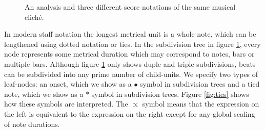 \begin{figure}[t]
\centering
{}

\caption{An analysis and three different score notations of the same musical clich\'e. }
\label{fig:subdivision}
\end{figure}

In modern staff notation the longest metrical unit is a whole note, which can be lengthened using dotted notation or ties. In the subdivision tree in figure \ref{fig:subdivision}, every node represents some metrical duration which may correspond to notes, bars or multiple bars. Although figure \ref{fig:subdivision} only shows duple and triple subdivisions, beats can be subdivided into any prime number of child-units. We specify two types of leaf-nodes: an onset, which we show as a $\bullet$ symbol in subdivision trees and a tied note, which we show as a $*$ symbol in subdivision trees. Figure \ref{fig:ties} shows how these symbols are interpreted. The $\propto$ symbol means that the expression on the left is equivalent to the expression on the right except for any global scaling of note durations.

